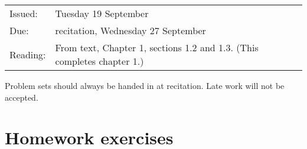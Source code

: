 % 
% 
% 
% 
% 
% 






\evensidemargin 35pt




\medskip

\begin{tabular}{ll}
Issued: & Tuesday 19 September \\
Due: & recitation, Wednesday 27 September \\
Reading: & From text, Chapter 1, sections 1.2 and 1.3.
(This completes chapter 1.)
\end{tabular}

\noindent
{\small Problem sets should always be handed in at recitation.  Late work will
not be accepted.}

\section{Homework exercises}

